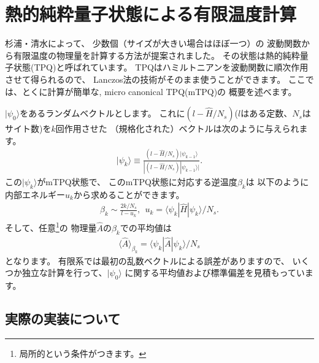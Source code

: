 \section{熱的純粋量子状態による有限温度計算}
\label{Ch:TPQ}
杉浦・清水によって、
少数個（サイズが大きい場合はほぼ一つ）の
波動関数から有限温度の物理量を計算する方法が提案されました\cite{Sugiura2012}。
その状態は熱的純粋量子状態(TPQ)と呼ばれています。
TPQはハミルトニアンを波動関数に順次作用させて得られるので、
Lanczos法の技術がそのまま使うことができます。
ここでは、とくに計算が簡単な, micro canonical TPQ(mTPQ)の
概要を述べます。

$|\psi_{0}\rangle$をあるランダムベクトルとします。
これに$(l-\hat{H}/N_{s})$($l$はある定数、$N_{s}$はサイト数)を$k$回作用させた
（規格化された）ベクトルは次のように与えられます。
\begin{align}
|\psi_{k}\rangle \equiv \frac{(l-\hat{H}/N_{s})|\psi_{k-1}\rangle}{|(l-\hat{H}/N_{s})|\psi_{k-1}\rangle|}.
\end{align}
この$|\psi_{k}\rangle$がmTPQ状態で、
このmTPQ状態に対応する逆温度$\beta_{k}$は
以下のように内部エネルギー$u_{k}$から求めることができます。
\begin{align}
\beta_{k}\sim \frac{2k/N_{s}}{l-u_{k}},~~
u_{k} = \langle \psi_{k}|\hat{H}|\psi_{k}\rangle/N_{s}.
\end{align}
そして、任意\footnote{局所的という条件がつきます。}の
物理量$\hat{A}$の$\beta_{k}$での平均値は
\begin{align}
\langle \hat{A}\rangle_{\beta_{k}} =  \langle \psi_{k}|\hat{A}|\psi_{k}\rangle/N_{s}
\end{align}
となります。
有限系では最初の乱数ベクトルによる誤差がありますので、
いくつか独立な計算を行って、$|\psi_{0}\rangle$
に関する平均値および標準偏差を見積もっています。

\subsection{実際の実装について}
